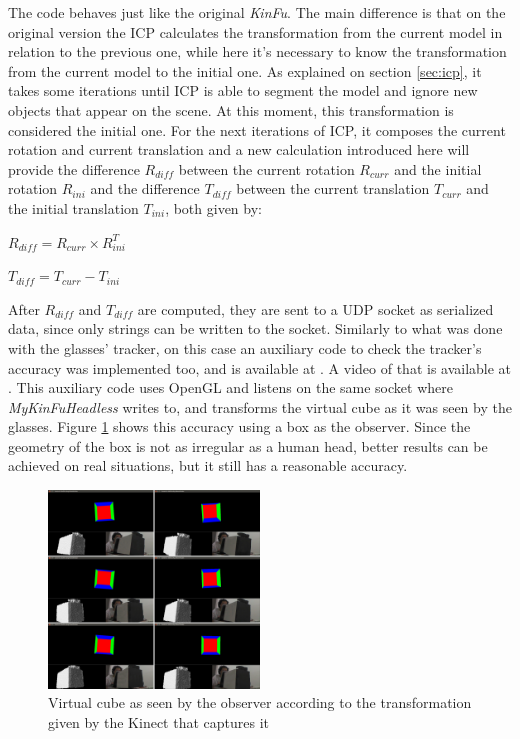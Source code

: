 \documentclass[msc, a4paper, classic, en]{ufbathesis}
\begin{document}
The code behaves just like the original \textit{KinFu}. The main difference is that on the original version the ICP calculates the transformation from the current model in relation to the previous one, while here it's necessary to know the transformation from the current model to the initial one. As explained on section \ref{sec:icp}, it takes some iterations until ICP is able to segment the model and ignore new objects that appear on the scene. At this moment, this transformation is considered the initial one. For the next iterations of ICP, it composes the current rotation and current translation and a new calculation introduced here will provide the difference $R_{diff}$ between the current rotation $R_{curr}$ and the initial rotation $R_{ini}$ and the difference $T_{diff}$ between the current translation $T_{curr}$ and the initial translation $T_{ini}$, both given by:

\begin{center}
$R_{diff} = R_{curr} \times R_{ini}^T$
\end{center}

\begin{center}
$T_{diff} = T_{curr} - T_{ini}$
\end{center}

After $R_{diff}$ and $T_{diff}$ are computed, they are sent to a UDP socket as serialized data, since only strings can be written to the socket. Similarly to what was done with the glasses' tracker, on this case an auxiliary code to check the tracker's accuracy was implemented too, and is available at \cite{masterproject}. A video of that is available at \cite{videos}. This auxiliary code uses OpenGL and listens on the same socket where \textit{MyKinFuHeadless} writes to, and transforms the virtual cube as it was seen by the glasses. Figure \ref{fig:secondkinecttrack} shows this accuracy using a box as the observer. Since the geometry of the box is not as irregular as a human head, better results can be achieved on real situations, but it still has a reasonable accuracy.

\begin{figure}
\centering
  \includegraphics[width=0.5\textwidth]{images/secondkinectrack.png}
\caption{Virtual cube as seen by the observer according to the transformation given by the Kinect that captures it}
\label{fig:secondkinecttrack}
\end{figure}
\end{document}
